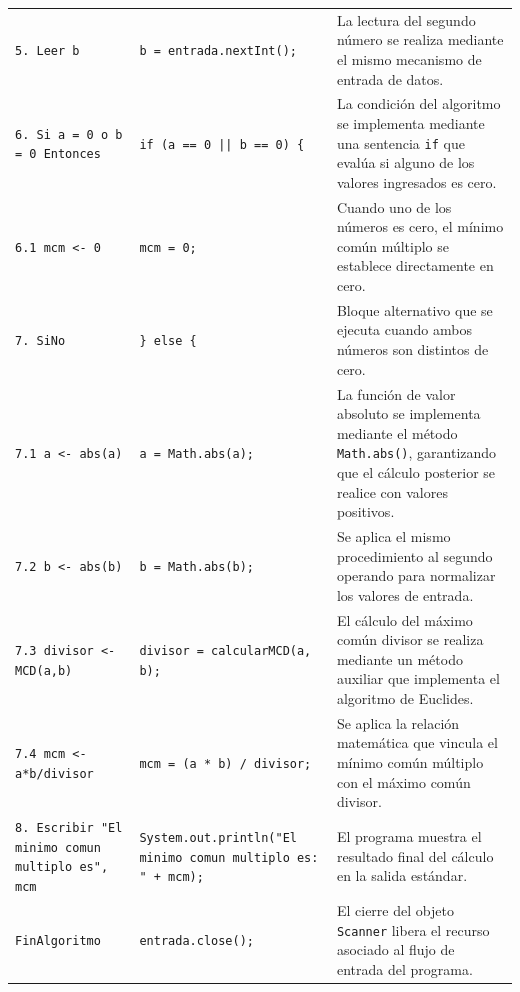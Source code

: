 \documentclass[12pt,twoside]{book}
\begin{document}
\begin{landscape}
\begin{longtable}{p{6cm} p{6cm} p{7.5cm}}
							
							\texttt{5. Leer b}
							&
							\texttt{b = entrada.nextInt();}
							&
							La lectura del segundo número se realiza mediante el mismo mecanismo de entrada de datos. \\
							
							
							\texttt{6. Si a = 0 o b = 0 Entonces}
							&
							\texttt{if (a == 0 || b == 0) \{}
							&
							La condición del algoritmo se implementa mediante una sentencia \texttt{if} que evalúa si alguno de los valores ingresados es cero. \\
							
							
							\texttt{6.1 mcm <- 0}
							&
							\texttt{mcm = 0;}
							&
							Cuando uno de los números es cero, el mínimo común múltiplo se establece directamente en cero. \\
							
							
							\texttt{7. SiNo}
							&
							\texttt{\} else \{}
							&
							Bloque alternativo que se ejecuta cuando ambos números son distintos de cero. \\
							
							
							\texttt{7.1 a <- abs(a)}
							&
							\texttt{a = Math.abs(a);}
							&
							La función de valor absoluto se implementa mediante el método \texttt{Math.abs()}, garantizando que el cálculo posterior se realice con valores positivos. \\
							
							
							\texttt{7.2 b <- abs(b)}
							&
							\texttt{b = Math.abs(b);}
							&
							Se aplica el mismo procedimiento al segundo operando para normalizar los valores de entrada. \\
							
							
							\texttt{7.3 divisor <- MCD(a,b)}
							&
							\texttt{divisor = calcularMCD(a, b);}
							&
							El cálculo del máximo común divisor se realiza mediante un método auxiliar que implementa el algoritmo de Euclides. \\
							
							
							\texttt{7.4 mcm <- a*b/divisor}
							&
							\texttt{mcm = (a * b) / divisor;}
							&
							Se aplica la relación matemática que vincula el mínimo común múltiplo con el máximo común divisor. \\
							
							
							\texttt{8. Escribir "El minimo comun multiplo es", mcm}
							&
							\texttt{System.out.println("El minimo comun multiplo es: " + mcm);}
							&
							El programa muestra el resultado final del cálculo en la salida estándar. \\
							
							
							\texttt{FinAlgoritmo}
							&
							\texttt{entrada.close();}
							&
							El cierre del objeto \texttt{Scanner} libera el recurso asociado al flujo de entrada del programa. \\					
						\end{longtable}
					\end{landscape}
					
\end{document}
